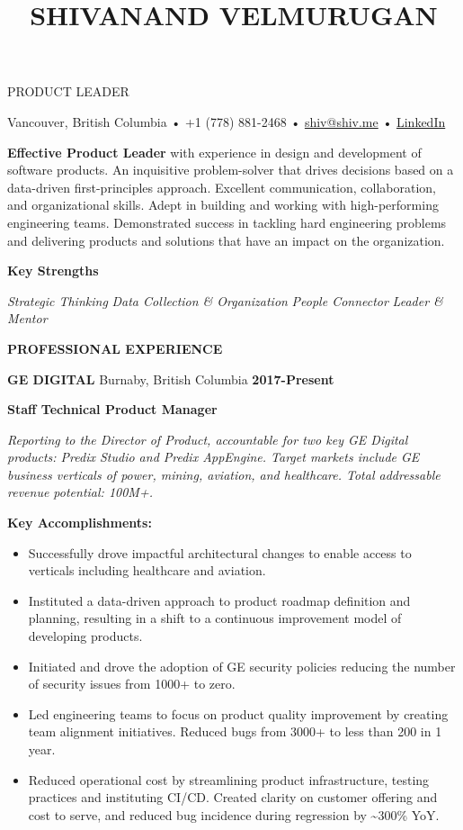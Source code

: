 \documentclass[
]{article}
\date{}
\newcommand{\LR}[1]{\beginL #1\endL}
\begin{document}
    \title{\begin{flushleft}SHIVANAND VELMURUGAN\end{flushleft}}
    \begin{flushright}\textsc{PRODUCT LEADER}\end{flushright}

\LR{Vancouver, British Columbia • +1 (778) 881-2468 •
\href{mailto:shiv@shiv.me}{{shiv@shiv.me}} •
\href{https://www.linkedin.com/in/vshivanand/}{{LinkedIn}}}

\LR{\textbf{Effective Product Leader} with experience in design and
development of software products. An inquisitive problem-solver that
drives decisions based on a data-driven first-principles approach.
Excellent communication, collaboration, and organizational skills. Adept
in building and working with high-performing engineering teams.
Demonstrated success in tackling hard engineering problems and
delivering products and solutions that have an impact on the
organization.}

\LR{}

\textbf{\LR{Key Strengths}}

\LR{\emph{Strategic Thinking} \textbar{} \emph{Data Collection \&
Organization} \textbar{} \emph{People Connector} \textbar{} \emph{Leader
\& Mentor}}

\LR{}

\LR{\textbf{PROFESSIONAL EXPERIENCE}}

\LR{\textbf{GE DIGITAL} Burnaby, British Columbia \textbf{2017-Present}}

\textbf{\LR{Staff Technical Product Manager}}

\emph{\LR{Reporting to the Director of Product, accountable for two key
GE Digital products: Predix Studio and Predix AppEngine. Target markets
include GE business verticals of power, mining, aviation, and
healthcare. Total addressable revenue potential: 100M+.}}

\textbf{\LR{Key Accomplishments:}}

\begin{itemize}
\item
  \LR{Successfully drove impactful architectural changes to enable
  access to verticals including healthcare and aviation.}
\item
  \LR{Instituted a data-driven approach to product roadmap definition
  and planning, resulting in a shift to a continuous improvement model
  of developing products.}
\item
  \LR{Initiated and drove the adoption of GE security policies reducing
  the number of security issues from 1000+ to zero.}
\item
  \LR{Led engineering teams to focus on product quality improvement by
  creating team alignment initiatives. Reduced bugs from 3000+ to less
  than 200 in 1 year.}
\item
  \LR{Reduced operational cost by streamlining product infrastructure,
  testing practices and instituting CI/CD. Created clarity on customer
  offering and cost to serve, and reduced bug incidence during
  regression by \textasciitilde300\% YoY.}
\end{itemize}
\end{document}
